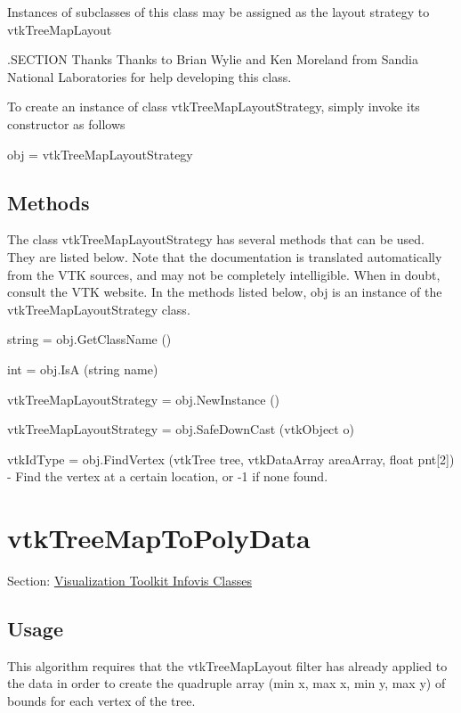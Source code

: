 Instances of subclasses of this class may be assigned as the layout strategy to vtk\-Tree\-Map\-Layout

.S\-E\-C\-T\-I\-O\-N Thanks Thanks to Brian Wylie and Ken Moreland from Sandia National Laboratories for help developing this class.

To create an instance of class vtk\-Tree\-Map\-Layout\-Strategy, simply invoke its constructor as follows \begin{DoxyVerb}  obj = vtkTreeMapLayoutStrategy
\end{DoxyVerb}
 \hypertarget{vtkwidgets_vtkxyplotwidget_Methods}{}\subsection{Methods}\label{vtkwidgets_vtkxyplotwidget_Methods}
The class vtk\-Tree\-Map\-Layout\-Strategy has several methods that can be used. They are listed below. Note that the documentation is translated automatically from the V\-T\-K sources, and may not be completely intelligible. When in doubt, consult the V\-T\-K website. In the methods listed below, {\ttfamily obj} is an instance of the vtk\-Tree\-Map\-Layout\-Strategy class. 
\begin{DoxyItemize}
\item {\ttfamily string = obj.\-Get\-Class\-Name ()}  
\item {\ttfamily int = obj.\-Is\-A (string name)}  
\item {\ttfamily vtk\-Tree\-Map\-Layout\-Strategy = obj.\-New\-Instance ()}  
\item {\ttfamily vtk\-Tree\-Map\-Layout\-Strategy = obj.\-Safe\-Down\-Cast (vtk\-Object o)}  
\item {\ttfamily vtk\-Id\-Type = obj.\-Find\-Vertex (vtk\-Tree tree, vtk\-Data\-Array area\-Array, float pnt\mbox{[}2\mbox{]})} -\/ Find the vertex at a certain location, or -\/1 if none found.  
\end{DoxyItemize}\hypertarget{vtkinfovis_vtktreemaptopolydata}{}\section{vtk\-Tree\-Map\-To\-Poly\-Data}\label{vtkinfovis_vtktreemaptopolydata}
Section\-: \hyperlink{sec_vtkinfovis}{Visualization Toolkit Infovis Classes} \hypertarget{vtkwidgets_vtkxyplotwidget_Usage}{}\subsection{Usage}\label{vtkwidgets_vtkxyplotwidget_Usage}
This algorithm requires that the vtk\-Tree\-Map\-Layout filter has already applied to the data in order to create the quadruple array (min x, max x, min y, max y) of bounds for each vertex of the tree.

